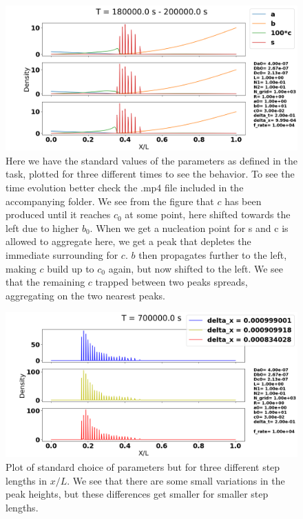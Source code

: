 \documentclass[1p]{elsarticle}        	%
\begin{document}
\begin{figure}[h]
	\centering
	\includegraphics[width=\linewidth]{../figures/standard_settings_time.png}
	\caption{Here we have the standard values of the parameters as defined in the task, plotted for three different times to see the behavior. To see the time evolution better check the .mp4 file included in the accompanying folder. We see from the figure that $c$ has been produced until it reaches $c_0$ at some point, here shifted towards the left due to higher $b_0$. When we get a nucleation point for s and c is allowed to aggregate here, we get a peak that depletes the immediate surrounding for $c$. $b$ then propagates further to the left, making $c$ build up to $c_0$ again, but now shifted to the left. We see that the  remaining $c$ trapped between two peaks spreads, aggregating on the two nearest peaks.}
	\label{fig:coords}
\end{figure}

\begin{figure}
	\centering
	\includegraphics[width=\linewidth]{../figures/deltaX.png}
	\caption{Plot of standard choice of parameters but for three different step lengths in $x/L$. We see that there are some small variations in the peak heights, but these differences get smaller for smaller step lengths.}
	\label{fig:coords}
\end{figure}
\end{document}

